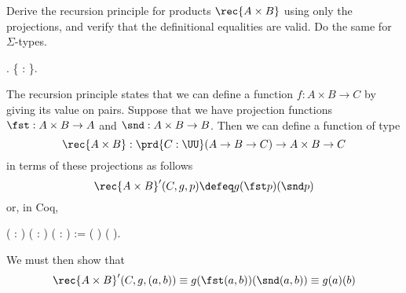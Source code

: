 Derive the recursion principle for products $\rec{A \times B}$ using only the
projections, and verify that the definitional equalities are valid.  Do the
same for $\Sigma$-types.  \begin{coqdoccode}
\coqdocemptyline
\coqdocnoindent
{} .\coqdoceol
\coqdocemptyline
\coqdocnoindent
{} \{  : \}.\coqdoceol
\coqdocemptyline
\end{coqdoccode}


\soln 
The recursion principle states that we can define a function $f : A
\times B \to C$ by giving its value on pairs.  Suppose that we have projection
functions $\fst : A \times B \to A$ and $\snd : A \times B \to B$.  Then we can
define a function of type
\[
\rec{A\times B} : \prd{C : \UU} (A \to B \to C) \to A \times B \to C
\]
in terms of these projections as follows
\[
\rec{A \times B}'(C, g, p) \defeq 
g(\fst p)(\snd p)
\]
or, in Coq,
\begin{coqdoccode}
\coqdocemptyline
\coqdocnoindent
{}  ( : ) ( :     ) ( :   ) :=  ( ) ( ).\coqdoceol
\coqdocemptyline
\end{coqdoccode}
We must then show that
\begin{align*}
  \rec{A\times B}'(C, g, (a, b)) 
  \equiv g(\fst (a, b))(\snd (a, b))
  \equiv g(a)(b)
\end{align*}
